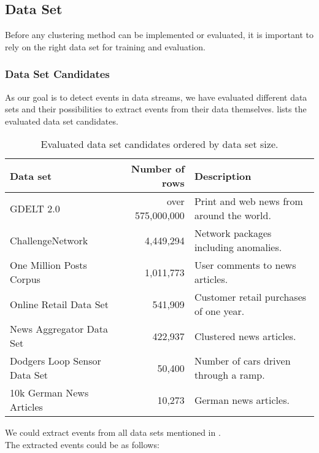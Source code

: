 \subsection{Data Set}
\label{subsec:4a_data_set}

Before any clustering method can be implemented or evaluated,
it is important to rely on the right data set for training and evaluation.

\subsubsection{Data Set Candidates}
\label{subsubsec:4a_data_set_candidates}

As our goal is to detect events in data streams, we have evaluated different data sets and
their possibilities to extract events from their data themselves.
 lists the evaluated data set candidates.

\begin{table}[h]
    \centering
    \begin{tabular}{|l|r|l|}
    \hline
    \textbf{Data set} & \textbf{Number of rows} & \textbf{Description} \\ \hline
    GDELT 2.0\cite{GDELT} & over 575,000,000 & Print and web news from around the world. \\ \hline
    ChallengeNetwork\cite{ChallengeNetwork} & 4,449,294 & Network packages including anomalies. \\ \hline
    One Million Posts Corpus\cite{OneMillionPostsCorpus} & 1,011,773 & User comments to news articles. \\ \hline
    Online Retail Data Set\cite{OnlineRetailDataSet} & 541,909 & Customer retail purchases of one year. \\ \hline
    News Aggregator Data Set\cite{NewsAggregatorDataSet} & 422,937 & Clustered news articles. \\ \hline
    Dodgers Loop Sensor Data Set\cite{DodgersLoopSensorDataSet} & 50,400 & Number of cars driven through a ramp. \\ \hline
    10k German News Articles\cite{10kGNAD} & 10,273 & German news articles. \\ \hline
    \end{tabular}
    \caption{Evaluated data set candidates ordered by data set size.}
    \label{tab:data_set_candidates}
\end{table}

We could extract events from all data sets mentioned in .\\
The extracted events could be as follows:

